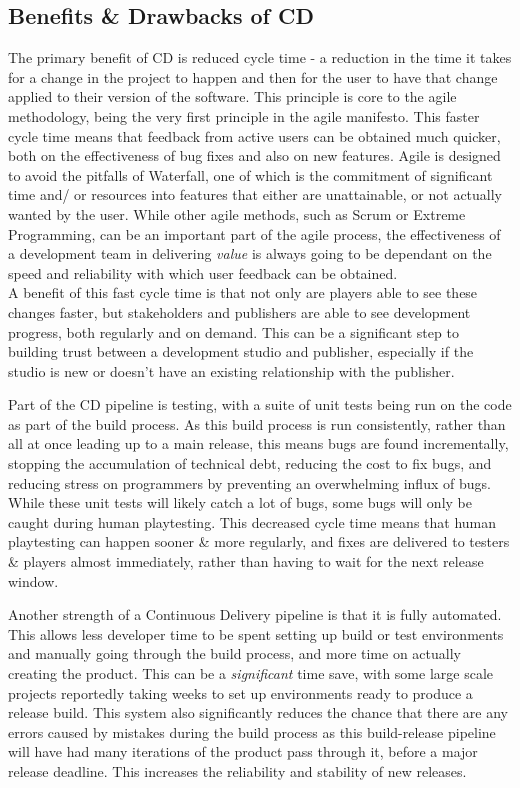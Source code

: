 \documentclass[journal]{IEEEtran}
\begin{document}
\subsection{Benefits \& Drawbacks of CD}
The primary benefit of CD is reduced cycle time - a reduction in the time it takes for a change in the project to happen and then for the user to have that change applied to their version of the software. This principle is core to the agile methodology, being the very first principle in the agile manifesto\cite{agilemanifesto}. This faster cycle time means that feedback from active users can be obtained much quicker, both on the effectiveness of bug fixes and also on new features. Agile is designed to avoid the pitfalls of Waterfall\cite{royce1987managing}, one of which is the commitment of significant time and/ or resources into features that either are unattainable, or not actually wanted by the user. While other agile methods, such as Scrum or Extreme Programming\cite{cohen2004introduction,agilewithscrum}, can be an important part of the agile process, the effectiveness of a development team in delivering \textit{value} is always going to be dependant on the speed and reliability with which user feedback can be obtained. \\
A benefit of this fast cycle time is that not only are players able to see these changes faster, but stakeholders and publishers are able to see development progress, both regularly and on demand. This can be a significant step to building trust between a development studio and publisher, especially if the studio is new or doesn't have an existing relationship with the publisher\cite{gamedevhandbook}.

Part of the CD pipeline is testing, with a suite of unit tests being run on the code as part of the build process. As this build process is run consistently, rather than all at once leading up to a main release, this means bugs are found incrementally, stopping the accumulation of technical debt, reducing the cost to fix bugs, and reducing stress on programmers by preventing an overwhelming influx of bugs. While these unit tests will likely catch a lot of bugs, some bugs will only be caught during human playtesting. This decreased cycle time means that human playtesting can happen sooner \& more regularly, and fixes are delivered to testers \& players almost immediately, rather than having to wait for the next release window.

Another strength of a Continuous Delivery pipeline is that it is fully automated. This allows less developer time to be spent setting up build or test environments and manually going through the build process, and more time on actually creating the product. This can be a \textit{significant} time save, with some large scale projects reportedly taking weeks to set up environments ready to produce a release build\cite{paddy, ContDelIntro}. This system also significantly reduces the chance that there are any errors caused by mistakes during the build process as this build-release pipeline will have had many iterations of the product pass through it, before a major release deadline. This increases the reliability and stability of new releases.
\end{document}

